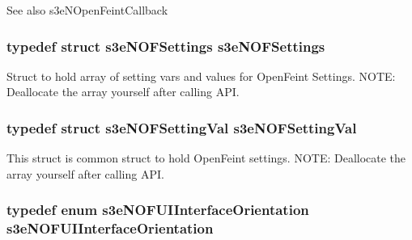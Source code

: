 \begin{DoxySeeAlso}{See also}
s3eNOpenFeintCallback 
\end{DoxySeeAlso}
\hypertarget{group___n_open_feint_api_group_ga0063f0a593d0853ca3d5ec8a41b3b835}{
\subsubsection[{s3eNOFSettings}]{\setlength{\rightskip}{0pt plus 5cm}typedef struct {\bf s3eNOFSettings}  {\bf s3eNOFSettings}}}
\label{group___n_open_feint_api_group_ga0063f0a593d0853ca3d5ec8a41b3b835}
Struct to hold array of setting vars and values for OpenFeint Settings. NOTE: Deallocate the array yourself after calling API. \hypertarget{group___n_open_feint_api_group_ga2c2981f021f2a69c8ab32ab6d1a3a4d6}{
\subsubsection[{s3eNOFSettingVal}]{\setlength{\rightskip}{0pt plus 5cm}typedef struct {\bf s3eNOFSettingVal}  {\bf s3eNOFSettingVal}}}
\label{group___n_open_feint_api_group_ga2c2981f021f2a69c8ab32ab6d1a3a4d6}
This struct is common struct to hold OpenFeint settings. NOTE: Deallocate the array yourself after calling API. \hypertarget{group___n_open_feint_api_group_gaae461961f162f751c87f8ca7134f26c9}{
\subsubsection[{s3eNOFUIInterfaceOrientation}]{\setlength{\rightskip}{0pt plus 5cm}typedef enum {\bf s3eNOFUIInterfaceOrientation}  {\bf s3eNOFUIInterfaceOrientation}}}
\label{group___n_open_feint_api_group_gaae461961f162f751c87f8ca7134f26c9}

